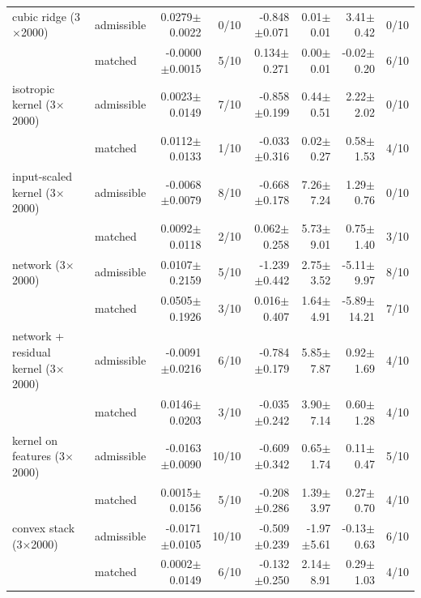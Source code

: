 \begin{tabular}{llrrrrrr}
cubic ridge (3$\times$2000) & admissible & 0.0279$\pm$0.0022 & 0/10 & -0.848$\pm$0.071 & 0.01$\pm$0.01 & 3.41$\pm$0.42 & 0/10 \\
 & matched & -0.0000$\pm$0.0015 & 5/10 & 0.134$\pm$0.271 & 0.00$\pm$0.01 & -0.02$\pm$0.20 & 6/10 \\
isotropic kernel (3$\times$2000) & admissible & 0.0023$\pm$0.0149 & 7/10 & -0.858$\pm$0.199 & 0.44$\pm$0.51 & 2.22$\pm$2.02 & 0/10 \\
 & matched & 0.0112$\pm$0.0133 & 1/10 & -0.033$\pm$0.316 & 0.02$\pm$0.27 & 0.58$\pm$1.53 & 4/10 \\
input-scaled kernel (3$\times$2000) & admissible & -0.0068$\pm$0.0079 & 8/10 & -0.668$\pm$0.178 & 7.26$\pm$7.24 & 1.29$\pm$0.76 & 0/10 \\
 & matched & 0.0092$\pm$0.0118 & 2/10 & 0.062$\pm$0.258 & 5.73$\pm$9.01 & 0.75$\pm$1.40 & 3/10 \\
network (3$\times$2000) & admissible & 0.0107$\pm$0.2159 & 5/10 & -1.239$\pm$0.442 & 2.75$\pm$3.52 & -5.11$\pm$9.97 & 8/10 \\
 & matched & 0.0505$\pm$0.1926 & 3/10 & 0.016$\pm$0.407 & 1.64$\pm$4.91 & -5.89$\pm$14.21 & 7/10 \\
network + residual kernel (3$\times$2000) & admissible & -0.0091$\pm$0.0216 & 6/10 & -0.784$\pm$0.179 & 5.85$\pm$7.87 & 0.92$\pm$1.69 & 4/10 \\
 & matched & 0.0146$\pm$0.0203 & 3/10 & -0.035$\pm$0.242 & 3.90$\pm$7.14 & 0.60$\pm$1.28 & 4/10 \\
kernel on features (3$\times$2000) & admissible & -0.0163$\pm$0.0090 & 10/10 & -0.609$\pm$0.342 & 0.65$\pm$1.74 & 0.11$\pm$0.47 & 5/10 \\
 & matched & 0.0015$\pm$0.0156 & 5/10 & -0.208$\pm$0.286 & 1.39$\pm$3.97 & 0.27$\pm$0.70 & 4/10 \\
convex stack (3$\times$2000) & admissible & -0.0171$\pm$0.0105 & 10/10 & -0.509$\pm$0.239 & -1.97$\pm$5.61 & -0.13$\pm$0.63 & 6/10 \\
 & matched & 0.0002$\pm$0.0149 & 6/10 & -0.132$\pm$0.250 & 2.14$\pm$8.91 & 0.29$\pm$1.03 & 4/10 \\
\bottomrule
\end{tabular}
